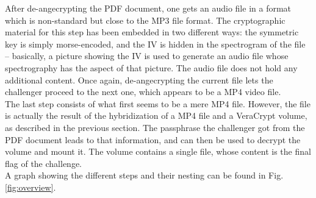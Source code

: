 \documentclass[12pt,a4paper]{article}
\begin{document}
    After de-angecrypting the PDF document, one gets an audio file in a format
    which is non-standard but close to the MP3 file format. The cryptographic
    material for this step has been embedded in two different ways: the
    symmetric key is simply morse-encoded, and the IV is hidden in the spectrogram of the file --
    basically, a picture showing the IV is used to generate an audio file whose
    spectrography has the aspect of that picture. The audio file does not hold any additional content. Once again,
    de-angecrypting the current file lets the challenger proceed to the next one,
    which appears to be a MP4 video file.\\

    The last step consists of what first seems to be a mere MP4 file.
    However, the file is actually the result of the hybridization of a MP4 file
    and a VeraCrypt volume, as described in the previous section. The passphrase
    the challenger got from the PDF document leads to that information, and can
    then be used to decrypt the volume and mount it. The volume contains a
    single file, whose content is the final flag of the challenge.\\

    

    A graph showing the different steps and their nesting can be found in Fig.\ref{fig:overview}.
\end{document}
